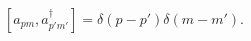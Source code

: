 \begin{equation}
\left[ a_{pm}, a_{p'm'}^{\dagger} \right] = \delta(p - p') \delta(m - m').
\end{equation}

